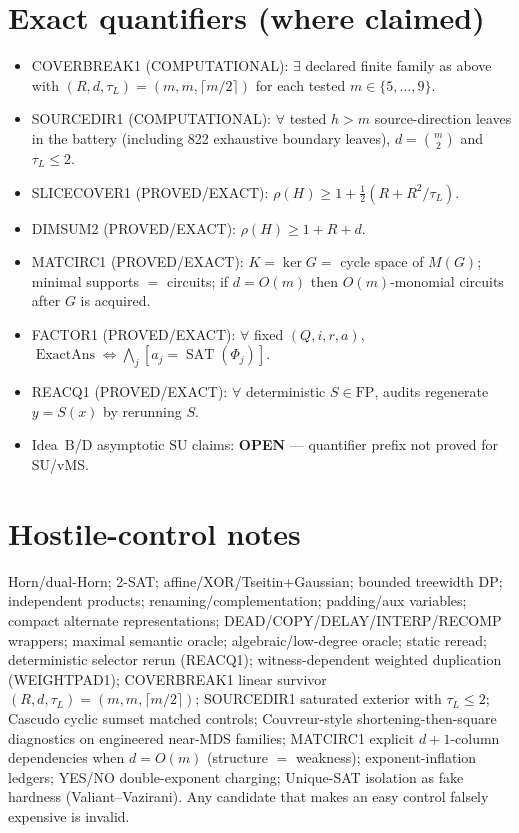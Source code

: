 \documentclass[11pt]{article}
\begin{document}
\section*{Exact quantifiers (where claimed)}
\begin{itemize}
\item COVERBREAK1 (COMPUTATIONAL): $\exists$ declared finite family as above with
$(R,d,\tau_L)=(m,m,\lceil m/2\rceil)$ for each tested $m\in\{5,\ldots,9\}$.
\item SOURCEDIR1 (COMPUTATIONAL): $\forall$ tested $h>m$ source-direction leaves in the battery
(including 822 exhaustive boundary leaves), $d=\binom{m}{2}$ and $\tau_L\le 2$.
\item SLICECOVER1 (PROVED/EXACT): $\rho(H)\ge 1+\tfrac12(R+R^2/\tau_L)$.
\item DIMSUM2 (PROVED/EXACT): $\rho(H)\ge 1+R+d$.
\item MATCIRC1 (PROVED/EXACT): $K=\ker G=$ cycle space of $M(G)$; minimal supports $=$ circuits;
if $d=O(m)$ then $O(m)$-monomial circuits after $G$ is acquired.
\item FACTOR1 (PROVED/EXACT): $\forall$ fixed $(Q,i,r,a)$,
$\operatorname{ExactAns}\iff\bigwedge_j[a_j=\operatorname{SAT}(\Phi_j)]$.
\item REACQ1 (PROVED/EXACT): $\forall$ deterministic $S\in\mathrm{FP}$, audits regenerate $y=S(x)$
by rerunning $S$.
\item Idea~B/D asymptotic SU claims: \textbf{OPEN} --- quantifier prefix not proved for SU/vMS.
\end{itemize}

\section*{Hostile-control notes}
Horn/dual-Horn; 2-SAT; affine/XOR/Tseitin+Gaussian; bounded treewidth DP; independent products;
renaming/complementation; padding/aux variables; compact alternate representations;
DEAD/COPY/DELAY/INTERP/RECOMP wrappers; maximal semantic oracle; algebraic/low-degree oracle;
static reread; deterministic selector rerun (REACQ1); witness-dependent weighted duplication
(WEIGHTPAD1); COVERBREAK1 linear survivor $(R,d,\tau_L)=(m,m,\lceil m/2\rceil)$;
SOURCEDIR1 saturated exterior with $\tau_L\le 2$; Cascudo cyclic sumset matched controls;
Couvreur-style shortening-then-square diagnostics on engineered near-MDS families;
MATCIRC1 explicit $d+1$-column dependencies when $d=O(m)$ (structure $=$ weakness);
exponent-inflation ledgers; YES/NO double-exponent charging; Unique-SAT isolation as fake hardness
(Valiant--Vazirani). Any candidate that makes an easy control falsely expensive is invalid.
\end{document}
